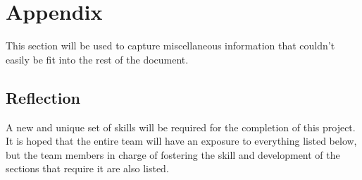 \documentclass[12pt]{article}
\begin{document}
\section{Appendix}
This section will be used to capture miscellaneous information that couldn't easily be fit into the rest of the document.  

\subsection{Reflection}





A new and unique set of skills will be required for the completion of this project. It is hoped that the entire team will have an exposure to everything listed below, but the team members in charge of fostering the skill and development of the sections that require it are also listed.
\end{document}
